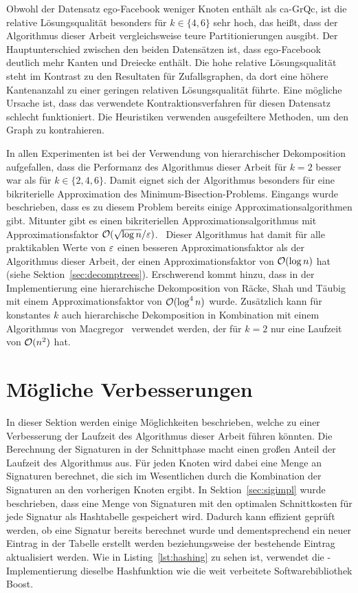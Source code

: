 Obwohl der Datensatz ego-Facebook weniger Knoten enthält als ca-GrQc, ist die relative Lösungsqualität besonders für $k \in \{4,6\}$ sehr hoch, das heißt, dass der Algorithmus dieser Arbeit vergleichsweise teure Partitionierungen ausgibt.
Der Hauptunterschied zwischen den beiden Datensätzen ist, dass ego-Facebook deutlich mehr Kanten und Dreiecke enthält.
Die hohe relative Lösungsqualität steht im Kontrast zu den Resultaten für Zufallsgraphen, da dort eine höhere Kantenanzahl zu einer geringen relativen Lösungsqualität führte.
Eine mögliche Ursache ist, dass das verwendete Kontraktionsverfahren für diesen Datensatz schlecht funktioniert.
Die Heuristiken verwenden ausgefeiltere Methoden, um den Graph zu kontrahieren.

In allen Experimenten ist bei der Verwendung von hierarchischer Dekomposition aufgefallen, dass die Performanz des Algorithmus dieser Arbeit für $k=2$ besser war als für $k \in \{2, 4, 6\}$.
Damit eignet sich der Algorithmus besonders für eine bikriterielle Approximation des Minimum-Bisection-Problems.
Eingangs wurde beschrieben, dass es zu diesem Problem bereits einige Approximationsalgorithmen gibt.
Mitunter gibt es einen bikriteriellen Approximationsalgorithmus mit Approximationsfaktor $\mathcal{O}(\sqrt{\log n}/\varepsilon)$.~\cite{LR99, ARV09}
Dieser Algorithmus hat damit für alle praktikablen Werte von $\varepsilon$ einen besseren Approximationsfaktor als der Algorithmus dieser Arbeit, der einen Approximationsfaktor von $\mathcal{O}(\log n)$ hat (siehe Sektion~\ref{sec:decomptrees}).
Erschwerend kommt hinzu, dass in der Implementierung eine hierarchische Dekomposition von Räcke, Shah und Täubig~\cite{RST14} mit einem Approximationsfaktor von $\mathcal{O}(\log^4 n)$ wurde. 
Zusätzlich kann für konstantes $k$ auch hierarchische Dekomposition in Kombination mit einem Algorithmus von Macgregor~\cite{mcg78} verwendet werden, der für $k=2$ nur eine Laufzeit von $\mathcal{O}(n^2)$ hat.

\section{Mögliche Verbesserungen}
In dieser Sektion werden einige Möglichkeiten beschrieben, welche zu einer Verbesserung der Laufzeit des Algorithmus dieser Arbeit führen könnten.
Die Berechnung der Signaturen in der Schnittphase macht einen großen Anteil der Laufzeit des Algorithmus aus.
Für jeden Knoten wird dabei eine Menge an Signaturen berechnet, die sich im Wesentlichen durch die Kombination der Signaturen an den vorherigen Knoten ergibt.
In Sektion~\ref{sec:sigimpl} wurde beschrieben, dass eine Menge von Signaturen mit den optimalen Schnittkosten für jede Signatur als Hashtabelle gespeichert wird.
Dadurch kann effizient geprüft werden, ob eine Signatur bereits berechnet wurde und dementsprechend ein neuer Eintrag in der Tabelle erstellt werden beziehungsweise der bestehende Eintrag aktualisiert werden.
Wie in Listing~\ref{lst:hashing} zu sehen ist, verwendet die \Cpp{}\hyp Implementierung dieselbe Hashfunktion wie die weit verbeitete Softwarebibliothek Boost.

